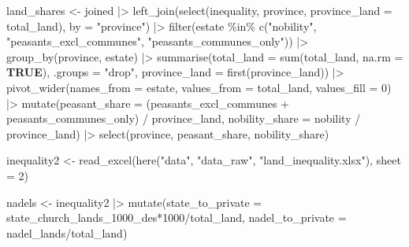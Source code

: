 \documentclass[
  9pt,
  letterpaper,
  DIV=11,
  numbers=noendperiod]{scrartcl}
\newenvironment{Shaded}{\begin{snugshade}}{\end{snugshade}}
\newcommand{\AttributeTok}[1]{\textcolor[rgb]{0.16,0.50,0.73}{#1}}
\newcommand{\ConstantTok}[1]{\textcolor[rgb]{0.15,0.68,0.68}{\textbf{#1}}}
\newcommand{\DecValTok}[1]{\textcolor[rgb]{0.96,0.45,0.00}{#1}}
\newcommand{\FunctionTok}[1]{\textcolor[rgb]{0.56,0.27,0.68}{#1}}
\newcommand{\NormalTok}[1]{\textcolor[rgb]{0.81,0.81,0.76}{#1}}
\newcommand{\OtherTok}[1]{\textcolor[rgb]{0.15,0.68,0.38}{#1}}
\newcommand{\SpecialCharTok}[1]{\textcolor[rgb]{0.24,0.68,0.91}{#1}}
\newcommand{\StringTok}[1]{\textcolor[rgb]{0.96,0.31,0.31}{#1}}
\begin{document}
\begin{Shaded}
\begin{Highlighting}[]
\NormalTok{land\_shares }\OtherTok{\textless{}{-}}\NormalTok{ joined }\SpecialCharTok{|\textgreater{}} 
  \FunctionTok{left\_join}\NormalTok{(}\FunctionTok{select}\NormalTok{(inequality, province, }\AttributeTok{province\_land =}\NormalTok{ total\_land),}
            \AttributeTok{by =} \StringTok{"province"}\NormalTok{) }\SpecialCharTok{|\textgreater{}} 
  \FunctionTok{filter}\NormalTok{(estate }\SpecialCharTok{\%in\%} \FunctionTok{c}\NormalTok{(}\StringTok{"nobility"}\NormalTok{, }\StringTok{"peasants\_excl\_communes"}\NormalTok{, }
                       \StringTok{"peasants\_communes\_only"}\NormalTok{)) }\SpecialCharTok{|\textgreater{}} 
  \FunctionTok{group\_by}\NormalTok{(province, estate) }\SpecialCharTok{|\textgreater{}} 
  \FunctionTok{summarise}\NormalTok{(}\AttributeTok{total\_land =} \FunctionTok{sum}\NormalTok{(total\_land, }\AttributeTok{na.rm =} \ConstantTok{TRUE}\NormalTok{), }\AttributeTok{.groups =} \StringTok{"drop"}\NormalTok{,}
            \AttributeTok{province\_land =} \FunctionTok{first}\NormalTok{(province\_land)) }\SpecialCharTok{|\textgreater{}} 
  \FunctionTok{pivot\_wider}\NormalTok{(}\AttributeTok{names\_from =}\NormalTok{ estate, }\AttributeTok{values\_from =}\NormalTok{ total\_land, }
              \AttributeTok{values\_fill =} \DecValTok{0}\NormalTok{) }\SpecialCharTok{|\textgreater{}} 
  \FunctionTok{mutate}\NormalTok{(}\AttributeTok{peasant\_share =}\NormalTok{ (peasants\_excl\_communes }\SpecialCharTok{+}\NormalTok{ peasants\_communes\_only) }\SpecialCharTok{/} 
\NormalTok{           province\_land,}
         \AttributeTok{nobility\_share =}\NormalTok{ nobility }\SpecialCharTok{/}\NormalTok{ province\_land) }\SpecialCharTok{|\textgreater{}} 
  \FunctionTok{select}\NormalTok{(province, peasant\_share, nobility\_share)}

\NormalTok{inequality2 }\OtherTok{\textless{}{-}} \FunctionTok{read\_excel}\NormalTok{(}\FunctionTok{here}\NormalTok{(}\StringTok{"data"}\NormalTok{, }\StringTok{"data\_raw"}\NormalTok{, }\StringTok{"land\_inequality.xlsx"}\NormalTok{), }
                          \AttributeTok{sheet =} \DecValTok{2}\NormalTok{)}

\NormalTok{nadels }\OtherTok{\textless{}{-}}\NormalTok{ inequality2 }\SpecialCharTok{|\textgreater{}} 
  \FunctionTok{mutate}\NormalTok{(}\AttributeTok{state\_to\_private =}\NormalTok{ state\_church\_lands\_1000\_des}\SpecialCharTok{*}\DecValTok{1000}\SpecialCharTok{/}\NormalTok{total\_land,}
         \AttributeTok{nadel\_to\_private =}\NormalTok{ nadel\_lands}\SpecialCharTok{/}\NormalTok{total\_land)}
\end{Highlighting}
\end{Shaded}
\end{document}
